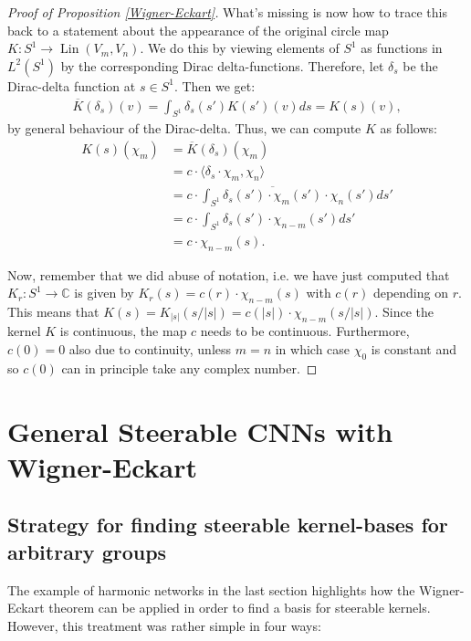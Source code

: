 \documentclass[12pt, a4paper]{article}
\theoremstyle{plain}
\theoremstyle{definition}
\theoremstyle{remark}
\newcommand{\C}{\mathds{C}}
\DeclareMathOperator{\lin}{Lin}
\begin{document}
\begin{proof}[Proof of Proposition \ref{Wigner-Eckart}]
What's missing is now how to trace this back to a statement about the appearance of the original circle map $K: S^1 \to \lin(V_m, V_n)$. We do this by viewing elements of $S^1$ as functions in $L^2(S^1)$ by the corresponding Dirac delta-functions. Therefore, let $\delta_s$ be the Dirac-delta function at $s \in S^1$. Then we get:
\begin{align*}
\overline{K}(\delta_s)(v) = \int_{S^1} \delta_s(s') K(s')(v)ds = K(s)(v),
\end{align*}
by general behaviour of the Dirac-delta. Thus, we can compute $K$ as follows:
\begin{align*}
K(s)(\chi_m) & = \overline{K}(\delta_s)(\chi_m) \\
& = c \cdot \langle \delta_s \cdot \chi_m , \chi_n \rangle \\
& = c \cdot \int_{S^1} \overline{\delta_s(s')\cdot \chi_m(s')} \cdot \chi_n(s') ds' \\
& = c \cdot \int_{S^1} \delta_s(s') \cdot \chi_{n-m}(s') ds' \\
& = c \cdot \chi_{n - m}(s).
\end{align*}

Now, remember that we did abuse of notation, i.e. we have just computed that $K_r: S^1 \to \C$ is given by $K_r(s) = c(r) \cdot \chi_{n-m}(s)$ with $c(r)$ depending on $r$. This means that $K(s) = K_{|s|}(s/|s|) = c(|s|) \cdot \chi_{n-m}(s/|s|)$. Since the kernel $K$ is continuous, the map $c$ needs to be continuous. Furthermore, $c(0) = 0$ also due to continuity, unless $m = n$ in which case $\chi_0$ is constant and so $c(0)$ can in principle take any complex number.

\end{proof}

\section{General Steerable CNNs with Wigner-Eckart}

\subsection{Strategy for finding steerable kernel-bases for arbitrary groups}

The example of harmonic networks in the last section highlights how the Wigner-Eckart theorem can be applied in order to find a basis for steerable kernels. However, this treatment was rather simple in four ways:
\end{document}
